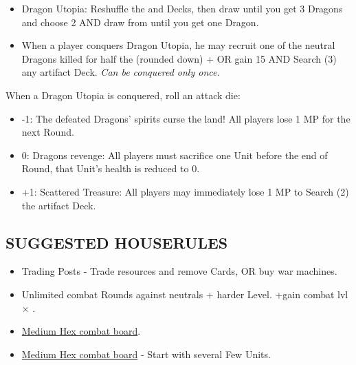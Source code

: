 \begin{multicols*}{2}
\begin{itemize}
  \item Dragon Utopia: Reshuffle the  and  Decks, then draw  until you get 3 Dragons and choose 2 AND draw from  until you get one Dragon. 
  \item When a player conquers Dragon Utopia, he may recruit one of the neutral Dragons killed for half the  (rounded down) +  OR gain 15  AND Search (3) any artifact Deck. \textit{Can be conquered only once.}
\end{itemize}

When a Dragon Utopia is conquered, roll an attack die:
\begin{itemize}
  \item -1: The defeated Dragons’ spirits curse the land! All players lose 1 MP for the next Round.
  \item  0: Dragons revenge: All players must sacrifice one Unit before the end of Round, that Unit's health is reduced to 0. 
  \item +1: Scattered Treasure: All players may immediately lose 1 MP to Search (2) the artifact Deck.
\end{itemize}

\subsection*{\MakeUppercase{Suggested houserules}}
\begin{itemize}
  \item Trading Posts - Trade resources and remove Cards, OR buy war machines.
  \item Unlimited combat Rounds against neutrals + harder Level. +gain combat lvl × .
  \item \href{https://boardgamegeek.com/thread/3445901/custom-hex-combat-board}{Medium Hex combat board}.
  \item \href{https://boardgamegeek.com/thread/3449937/houserule-for-stacking-more-than-pack}{Medium Hex combat board} - Start with several Few  Units.
\end{itemize}

\vspace*{\fill}

\end{multicols*}

